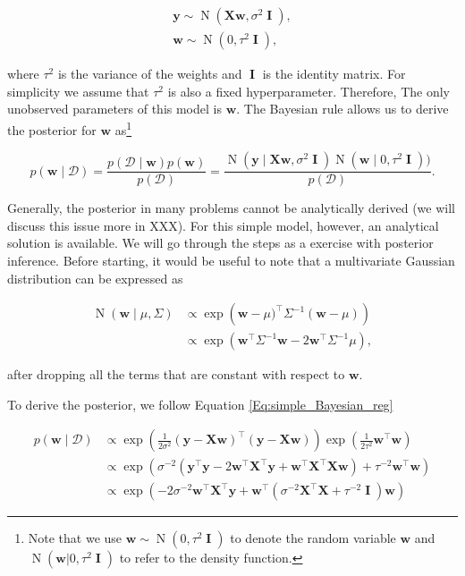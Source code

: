 \documentclass[dissertation,math,vertlayout,pdfa,colorlinks]{aaltoseries}
\newcommand{\bw}{\bm{w}}
\newcommand{\bX}{\bm{X}}
\newcommand{\by}{\bm{y}}
\newcommand{\bD}{\mathcal{D}}
\DeclareMathOperator{\eye}{\textbf{I}}
\DeclareMathOperator{\normalpdf}{N}
\newcommand{\tp}{^{\top}}
\begin{document}
\begin{align*} 
\by \sim \normalpdf(\bX\bm{w},\sigma^2 \eye),\\
\bm{w} \sim \normalpdf(0,\tau^2 \eye), 
\end{align*}

\noindent where $\tau^2$ is the variance of the weights and $\eye$ is the identity matrix. For simplicity we assume that $\tau^2$ is also a fixed hyperparameter. Therefore, The only unobserved parameters of this model is $\bm{w}$. The Bayesian rule allows us to derive the posterior for $\bm{w}$ as\footnote{Note that we use $\bm{w} \sim \normalpdf(0,\tau^2 \eye)$ to denote the random variable $\bm{w}$ and $\normalpdf(\bm{w}|0,\tau^2 \eye)$ to refer to the density function.}

\begin{equation}\label{Eq:simple_Bayesian_reg}
p(\bm{w} \mid \bD) = \frac{p(\bD \mid \bm{w})p(\bm{w})}{p(\bD)} = \frac{\normalpdf(\by \mid \bX \bm{w},\sigma^2 \eye) \normalpdf(\bw \mid 0,\tau^2 \eye))}{p(\bD)}.
\end{equation}  

Generally, the posterior in many problems cannot be analytically derived (we will discuss this issue more in XXX). For this simple model, however, an analytical solution is available. We will go through the steps as a exercise with posterior inference. Before starting, it would be useful to note that a multivariate Gaussian distribution can be expressed as  

\begin{align}\label{Eq:multi_Gauss}
\normalpdf(\bw \mid \mu,\Sigma) &\propto \exp \left (\bw - \mu)\tp\Sigma^{-1}(\bw - \mu) \right) \nonumber\\
&\propto \exp \left ( \bw\tp\Sigma^{-1}\bw -  2\bw\tp\Sigma^{-1}\mu \right),
\end{align}

\noindent after dropping all the terms that are constant with respect to $\bw$. 

To derive the posterior, we follow Equation \ref{Eq:simple_Bayesian_reg} 

\begin{align} \label{Eq:lin_rel_simple_derivation}
p(\bm{w} \mid \bD) &\propto \exp \left(\frac{1}{2\sigma^2} (\by - \bX \bw)\tp(\by - \bX \bw)\right) \exp(\frac{1}{2\tau^2}\bm{w}\tp\bm{w}) \nonumber\\ 
&\propto \exp \left (\sigma^{-2}(\by\tp\by - 2\bm{w}\tp\bX\tp\by + \bm{w}\tp\bX\tp\bX\bm{w})+ \tau^{-2}\bm{w}\tp\bm{w} \right) \nonumber\\
&\propto \exp \left ( -2\sigma^{-2}\bm{w}\tp\bX\tp\by + \bm{w}\tp( \sigma^{-2}\bX\tp\bX + \tau^{-2} \eye )\bm{w} \right) %
\end{align}    
 
\end{document}
